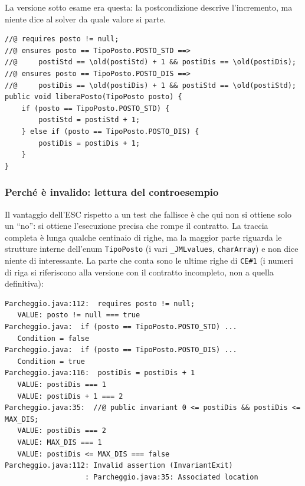 
La versione sotto esame era questa: la postcondizione descrive l'incremento, ma niente
dice al solver da quale valore si parte.

\begin{lstlisting}[style=terminal, caption={Prima versione di liberaPosto (senza il requires di capacità)}]
//@ requires posto != null;
//@ ensures posto == TipoPosto.POSTO_STD ==>
//@     postiStd == \old(postiStd) + 1 && postiDis == \old(postiDis);
//@ ensures posto == TipoPosto.POSTO_DIS ==>
//@     postiDis == \old(postiDis) + 1 && postiStd == \old(postiStd);
public void liberaPosto(TipoPosto posto) {
    if (posto == TipoPosto.POSTO_STD) {
        postiStd = postiStd + 1;
    } else if (posto == TipoPosto.POSTO_DIS) {
        postiDis = postiDis + 1;
    }
}
\end{lstlisting}

\subsubsection{Perché è invalido: lettura del controesempio}

Il vantaggio dell'ESC rispetto a un test che fallisce è che qui non si ottiene solo un
``no'': si ottiene l'esecuzione precisa che rompe il contratto. La traccia completa è
lunga qualche centinaio di righe, ma la maggior parte riguarda le strutture interne
dell'enum \texttt{TipoPosto} (i vari \texttt{\_JMLvalues}, \texttt{charArray}) e non dice
niente di interessante. La parte che conta sono le ultime righe di \texttt{CE\#1} (i
numeri di riga si riferiscono alla versione con il contratto incompleto, non a quella
definitiva):

\begin{lstlisting}[style=terminal, caption={Estratto di CE\#1: il ramo del posto disabile}]
Parcheggio.java:112:  requires posto != null;
   VALUE: posto != null === true
Parcheggio.java:  if (posto == TipoPosto.POSTO_STD) ...
   Condition = false
Parcheggio.java:  if (posto == TipoPosto.POSTO_DIS) ...
   Condition = true
Parcheggio.java:116:  postiDis = postiDis + 1
   VALUE: postiDis === 1
   VALUE: postiDis + 1 === 2
Parcheggio.java:35:  //@ public invariant 0 <= postiDis && postiDis <= MAX_DIS;
   VALUE: postiDis === 2
   VALUE: MAX_DIS === 1
   VALUE: postiDis <= MAX_DIS === false
Parcheggio.java:112: Invalid assertion (InvariantExit)
                   : Parcheggio.java:35: Associated location
\end{lstlisting}


